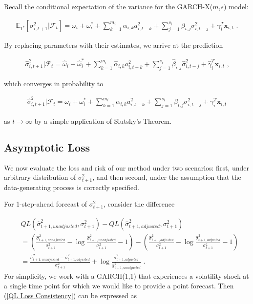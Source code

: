 \documentclass[11pt]{article}
\newcommand{\x}{\textbf{x}}
\def\E{\mathbb{E}} %
\theoremstyle{definition}
\newenvironment{proof-of-proposition}[1][{}]{\noindent{\bf
    Proof of Proposition {#1}}
  \hspace*{.5em}}{\qed\bigskip\\}
\begin{document}
\begin{proof-of-proposition}
Recall the conditional expectation of the variance for the GARCH-X($m$,$s$) model:

\begin{align*}
\E_{T^{*}}[\sigma^{2}_{i,t+1}|\mathcal{F}_{t}] = \omega_{i} + \omega^{*}_i + \sum^{m_{i}}_{k=1}\alpha_{i,k}a^{2}_{i,t-k} + \sum_{j=1}^{s_{i}}\beta_{i,j}\sigma_{i,t-j}^{2} + \gamma_{i}^{T} \x_{i,t} \text{ .}
\end{align*}

By replacing parameters with their estimates, we arrive at the prediction 

\begin{align*}
\hat\sigma^{2}_{i,t+1}|\mathcal{F}_{t} = \hat\omega_{i} + \hat\omega^{*}_i + \sum^{m_{i}}_{k=1}\hat\alpha_{i,k}a^{2}_{i,t-k} + \sum_{j=1}^{s_{i}}\hat\beta_{i,j}\hat\sigma_{i,t-j}^{2} + \hat\gamma_{i}^{T} \x_{i,t} \text { ,}
\end{align*}

which converges in probability to 

\begin{align*}
  \hat\sigma^{2}_{i,t+1}|\mathcal{F}_{t} = \omega_{i} + \omega^{*}_i + \sum^{m_{i}}_{k=1}\alpha_{i,k}a^{2}_{i,t-k} + \sum_{j=1}^{s_{i}}\beta_{i,j}\sigma_{i,t-j}^{2} + \gamma_{i}^{T} \x_{i,t}
  \end{align*}

as $t\rightarrow\infty$ by a simple application of Slutsky's Theorem.

\end{proof-of-proposition}

\subsection{Asymptotic Loss}

We now evaluate the loss and risk of our method under two scenarios: first, under arbitrary distribution of $\sigma^{2}_{t+1}$, and then second, under the assumption that the data-generating process is correctly specified.

For 1-step-ahead forecast of $\sigma^{2}_{t+1}$, consider the difference 

\begin{align*}
  & QL(\hat\sigma_{t+1, unadjusted}^{2},\sigma^{2}_{t+1})-QL(\hat\sigma^{2}_{t+1, adjusted},\sigma^{2}_{t+1})\\
   & =(\frac{\hat\sigma^{2}_{t+1,unadjusted}}{\sigma_{t+1}^{2}} - \log{\frac{\hat\sigma^{2}_{t+1,unadjusted}}{\sigma_{t+1}^{2}}} - 1) - (\frac{\hat\sigma^{2}_{t+1,adjusted}}{\sigma_{t+1}^{2}} - \log{\frac{\hat\sigma^{2}_{t+1,adjusted}}{\sigma_{t+1}^{2}}} - 1)\\
   & = \frac{\hat\sigma^{2}_{t+1,unadjusted}-\hat\sigma^{2}_{t+1,adjusted}}{\sigma_{t+1}^{2}} + \log{\frac{\hat\sigma^{2}_{t+1,adjusted}}{\hat\sigma^{2}_{t+1,unadjusted}}}\label{QL Loss Consistency} \text{ .}
\end{align*}
For simplicity, we work with a GARCH(1,1) that experiences a volatility shock at a single time point for which we would like to provide a point forecast.  Then (\ref{QL Loss Consistency}) can be expressed as
\end{document}
